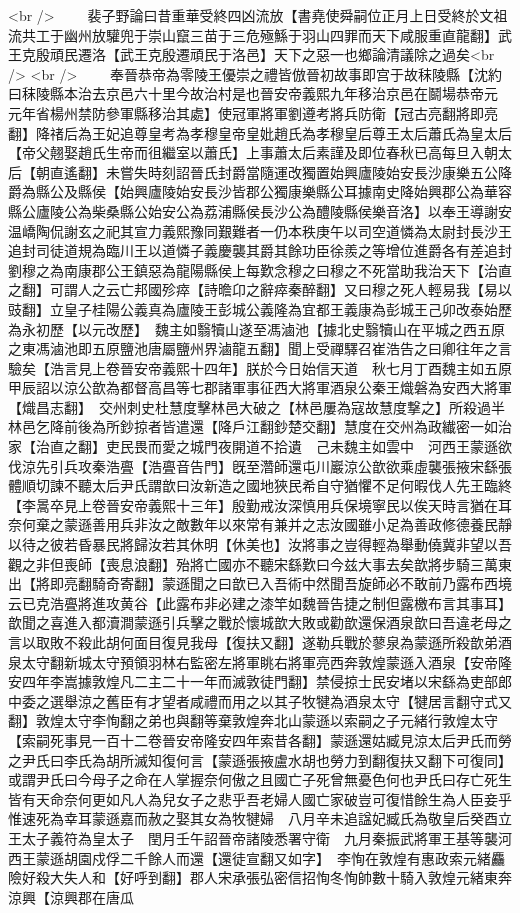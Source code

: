 <br />
　　裴子野論曰昔重華受終四凶流放【書堯使舜嗣位正月上日受終於文祖流共工于幽州放驩兜于崇山竄三苗于三危殛鯀于羽山四罪而天下咸服重直龍翻】武王克殷頑民遷洛【武王克殷遷頑民于洛邑】天下之惡一也鄉論清議除之過矣<br />
<br />
　　奉晉恭帝為零陵王優崇之禮皆倣晉初故事即宫于故秣陵縣【沈約曰秣陵縣本治去京邑六十里今故治村是也晉安帝義熙九年移治京邑在鬬場恭帝元元年省楊州禁防參軍縣移治其處】使冠軍將軍劉遵考將兵防衛【冠古亮翻將即亮翻】降禇后為王妃追尊皇考為孝穆皇帝皇妣趙氏為孝穆皇后尊王太后蕭氏為皇太后【帝父翹娶趙氏生帝而徂繼室以蕭氏】上事蕭太后素謹及即位春秋已高每旦入朝太后【朝直遙翻】未嘗失時刻詔晉氏封爵當隨運改獨置始興廬陵始安長沙康樂五公降爵為縣公及縣侯【始興廬陵始安長沙皆郡公獨康樂縣公耳據南史降始興郡公為華容縣公廬陵公為柴桑縣公始安公為荔浦縣侯長沙公為醴陵縣侯樂音洛】以奉王導謝安温嶠陶侃謝玄之祀其宣力義熙豫同艱難者一仍本秩庚午以司空道憐為太尉封長沙王追封司徒道規為臨川王以道憐子義慶襲其爵其餘功臣徐羨之等增位進爵各有差追封劉穆之為南康郡公王鎮惡為龍陽縣侯上每歎念穆之曰穆之不死當助我治天下【治直之翻】可謂人之云亡邦國殄瘁【詩曕卬之辭瘁秦醉翻】又曰穆之死人輕易我【易以豉翻】立皇子桂陽公義真為廬陵王彭城公義隆為宜都王義康為彭城王己卯改泰始歷為永初歷【以元改歷】　魏主如翳犢山遂至馮滷池【據北史翳犢山在平城之西五原之東馮滷池即五原鹽池唐屬鹽州界滷龍五翻】聞上受禪驛召崔浩告之曰卿往年之言驗矣【浩言見上卷晉安帝義熙十四年】朕於今日始信天道　秋七月丁酉魏主如五原　甲辰詔以涼公歆為都督高昌等七郡諸軍事征西大將軍酒泉公秦王熾磐為安西大將軍【熾昌志翻】　交州刺史杜慧度擊林邑大破之【林邑屢為寇故慧度撃之】所殺過半林邑乞降前後為所鈔掠者皆遣還【降戶江翻鈔楚交翻】慧度在交州為政纎密一如治家【治直之翻】吏民畏而愛之城門夜開道不拾遺　己未魏主如雲中　河西王蒙遜欲伐涼先引兵攻秦浩亹【浩亹音告門】旣至濳師還屯川巖涼公歆欲乘虛襲張掖宋繇張體順切諫不聽太后尹氏謂歆曰汝新造之國地狹民希自守猶懼不足何暇伐人先王臨終【李暠卒見上卷晉安帝義熙十三年】殷勤戒汝深慎用兵保境寧民以俟天時言猶在耳奈何棄之蒙遜善用兵非汝之敵數年以來常有兼并之志汝國雖小足為善政修德養民靜以待之彼若昏暴民將歸汝若其休明【休美也】汝將事之豈得輕為舉動僥冀非望以吾觀之非但喪師【喪息浪翻】殆將亡國亦不聽宋繇歎曰今兹大事去矣歆將步騎三萬東出【將即亮翻騎奇寄翻】蒙遜聞之曰歆已入吾術中然聞吾旋師必不敢前乃露布西境云已克浩亹將進攻黄谷【此露布非必建之漆竿如魏晉告捷之制但露檄布言其事耳】歆聞之喜進入都瀆澗蒙遜引兵擊之戰於懷城歆大敗或勸歆還保酒泉歆曰吾違老母之言以取敗不殺此胡何面目復見我母【復扶又翻】遂勒兵戰於蓼泉為蒙遜所殺歆弟酒泉太守翻新城太守預領羽林右監密左將軍眺右將軍亮西奔敦煌蒙遜入酒泉【安帝隆安四年李嵩據敦煌凡二主二十一年而滅敦徒門翻】禁侵掠士民安堵以宋繇為吏部郎中委之選舉涼之舊臣有才望者咸禮而用之以其子牧犍為酒泉太守【犍居言翻守式又翻】敦煌太守李恂翻之弟也與翻等棄敦煌奔北山蒙遜以索嗣之子元緒行敦煌太守【索嗣死事見一百十二卷晉安帝隆安四年索昔各翻】蒙遜還姑臧見涼太后尹氏而勞之尹氏曰李氏為胡所滅知復何言【蒙遜張掖盧水胡也勞力到翻復扶又翻下可復同】或謂尹氏曰今母子之命在人掌握奈何傲之且國亡子死曾無憂色何也尹氏曰存亡死生皆有天命奈何更如凡人為兒女子之悲乎吾老婦人國亡家破豈可復惜餘生為人臣妾乎惟速死為幸耳蒙遜嘉而赦之娶其女為牧犍婦　八月辛未追諡妃臧氏為敬皇后癸酉立王太子義符為皇太子　閏月壬午詔晉帝諸陵悉署守衛　九月秦振武將軍王基等襲河西王蒙遜胡園戍俘二千餘人而還【還徒宣翻又如字】　李恂在敦煌有惠政索元緒麤險好殺大失人和【好呼到翻】郡人宋承張弘密信招恂冬恂帥數十騎入敦煌元緒東奔涼興【涼興郡在唐瓜